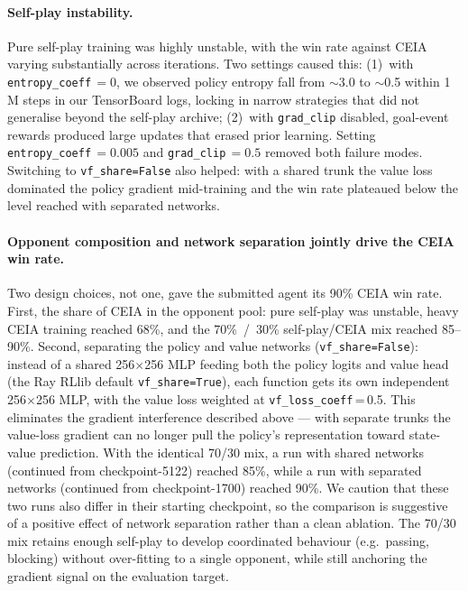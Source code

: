 \documentclass{article}
\begin{document}
\paragraph{Self-play instability.}
Pure self-play training was highly unstable, with the win rate against CEIA varying
substantially across iterations. Two settings caused this: (1)~with
\texttt{entropy\_coeff}\,$=\!0$, we observed policy entropy fall from $\sim$3.0 to
$\sim$0.5 within 1\,M steps in our TensorBoard logs, locking in narrow strategies
that did not generalise beyond the self-play archive; (2)~with \texttt{grad\_clip} disabled, goal-event rewards produced
large updates that erased prior learning. Setting
\texttt{entropy\_coeff}\,$=\!0.005$ and \texttt{grad\_clip}\,$=\!0.5$ removed both
failure modes. Switching to \texttt{vf\_share=False} also helped: with a shared trunk
the value loss dominated the policy gradient mid-training and the win rate plateaued
below the level reached with separated networks.

\paragraph{Opponent composition and network separation jointly drive the CEIA
win rate.}
Two design choices, not one, gave the submitted agent its 90\% CEIA win rate. First,
the share of CEIA in the opponent pool: pure self-play was unstable, heavy CEIA
training reached 68\%, and the 70\%~/~30\% self-play/CEIA mix reached 85--90\%.
Second, separating the policy and value networks (\texttt{vf\_share=False}): instead
of a shared 256$\times$256 MLP feeding both the policy logits and value head (the
Ray RLlib default \texttt{vf\_share=True}), each function gets its own independent
256$\times$256 MLP, with the value loss weighted at \texttt{vf\_loss\_coeff}\,=\,0.5.
This eliminates the gradient interference described above --- with separate trunks
the value-loss gradient can no longer pull the policy's representation toward
state-value prediction. With the identical 70/30 mix, a run with shared networks
(continued from checkpoint-5122) reached 85\%, while a run with separated networks
(continued from checkpoint-1700) reached 90\%. We caution that these two runs also differ in their starting
checkpoint, so the comparison is suggestive of a positive effect of network separation
rather than a clean ablation. The 70/30 mix retains enough self-play to develop
coordinated behaviour (e.g.\ passing, blocking) without over-fitting to a single
opponent, while still anchoring the gradient signal on the evaluation target.
\end{document}
